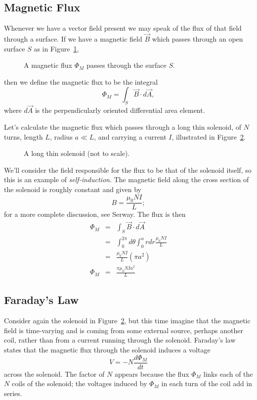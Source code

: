 \subsection{Magnetic Flux}

Whenever we have a vector field present we may speak of the flux of that field 
through a surface.  If we have a magnetic field $\vec{B}$ which passes through 
an open surface $S$ as in Figure~\ref{fig:ind:fluxdef},
\begin{figure}[htb]
\centerline{\epsfxsize=7cm }
\caption{A magnetic flux $\Phi_M$ passes through the surface $S$.}
\label{fig:ind:fluxdef}
\end{figure}
then we define the magnetic flux to be the integral
$$
\Phi_M=\int_S \vec{B}\cdot d\vec{A},
$$
where $d\vec{A}$ is the perpendicularly oriented differential area element.

Let's calculate the magnetic flux which passes through a long thin solenoid, 
of $N$ turns, length $L$, radius $a\ll L$, and carrying a current $I$, 
illustrated in Figure~\ref{fig:ind:solenoid}. 
\begin{figure}[htb]
\centerline{\epsfxsize=9cm }
\caption{A long thin solenoid (not to scale).}
\label{fig:ind:solenoid}
\end{figure}
We'll consider the field responsible for the flux to be that of the solenoid 
itself, so this is an example of {\it self-induction}. The magnetic field 
along the cross section of the solenoid is roughly constant and given by
$$ B= \frac{\mu_0 N I}{L}; $$
for a more complete discussion, see Serway. The flux is then
\begin{eqnarray}
\Phi_M &=& \int_S \vec{B}\cdot d\vec{A} \nonumber \\
&=& \int_0^{2\pi} d\theta \int_0^a r dr \frac{\mu_0 NI}{L} \nonumber \\
&=& \frac{\mu_0 NI}{L} (\pi a^2) \nonumber \\
\Phi_M &=& \frac{\pi\mu_0N Ia^2}{L} \label{eq:ind:fluxgen}
\end{eqnarray}

\subsection{Faraday's Law}

Consider again the solenoid in Figure~\ref{fig:ind:solenoid}, but this time 
imagine that the magnetic field is time-varying and is coming from some
external source, perhaps another coil, rather than from a current running 
through the solenoid.  Faraday's law states that the magnetic flux through the 
solenoid induces a voltage
\begin{equation}
V=-N\frac{d\Phi_M}{dt} \label{eq:ind:faraday}
\end{equation}
across the solenoid.  The factor of $N$ appears because the flux $\Phi_M$ links
each of the $N$ coils of the solenoid; the voltages induced by $\Phi_M$ in 
each turn of the coil add in series. 

